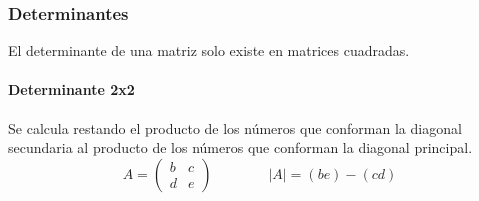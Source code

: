 \documentclass[stu, 12pt, a4paper, donotrepeattitle, floatsintext, natbib]{apa7}
\begin{document}
    \subsubsection{Determinantes}
    El determinante de una matriz solo existe en matrices cuadradas.

    \paragraph{Determinante 2x2}
    Se calcula restando el producto de los números que conforman la diagonal secundaria al producto de los números que conforman la diagonal principal.
    \[
        A=\begin{pmatrix}
              b & c \\ d & e
        \end{pmatrix}
        \qquad
        \qquad
        |A|= (be) - (cd)
    \]
\end{document}
